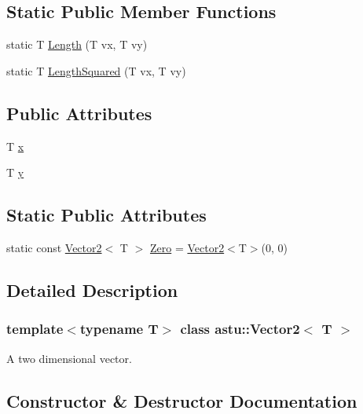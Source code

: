 \subsection*{Static Public Member Functions}
\begin{DoxyCompactItemize}
\item 
static T \hyperlink{classastu_1_1Vector2_a7fdf839b6c3444121dc6fb2eb88c200e}{Length} (T vx, T vy)
\item 
static T \hyperlink{classastu_1_1Vector2_afbc3ba40ff99e66abbe5db6b5adb6b97}{Length\+Squared} (T vx, T vy)
\end{DoxyCompactItemize}
\subsection*{Public Attributes}
\begin{DoxyCompactItemize}
\item 
T \hyperlink{classastu_1_1Vector2_aa60c30b27742255fbe7053b07a7e76ba}{x}
\item 
T \hyperlink{classastu_1_1Vector2_a6718f5a7005c38830dbd31283a87f5c9}{y}
\end{DoxyCompactItemize}
\subsection*{Static Public Attributes}
\begin{DoxyCompactItemize}
\item 
static const \hyperlink{classastu_1_1Vector2}{Vector2}$<$ T $>$ \hyperlink{classastu_1_1Vector2_adba359bd590f9b4f43623c817c7f5e46}{Zero} = \hyperlink{classastu_1_1Vector2}{Vector2}$<$T$>$(0, 0)
\end{DoxyCompactItemize}


\subsection{Detailed Description}
\subsubsection*{template$<$typename T$>$\newline
class astu\+::\+Vector2$<$ T $>$}

A two dimensional vector. 

\subsection{Constructor \& Destructor Documentation}
\mbox{\label{classastu_1_1Vector2_a021ec0e80fa7ca80921a17172e30fe29}} 
